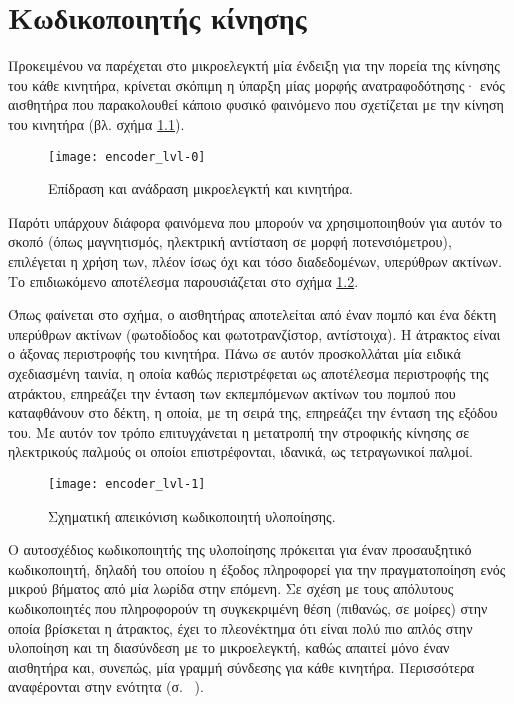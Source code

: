 \chapter{Κωδικοποιητής κίνησης}

Προκειμένου να παρέχεται στο μικροελεγκτή μία ένδειξη για την πορεία της κίνησης
του κάθε κινητήρα, κρίνεται σκόπιμη η ύπαρξη μίας μορφής ανατραφοδότησης· ενός
αισθητήρα που παρακολουθεί κάποιο φυσικό φαινόμενο που σχετίζεται με την κίνηση
του κινητήρα (βλ. σχήμα \ref{fig:encoder:lvl-0}).

\begin{figure}
    \caption{Επίδραση και ανάδραση μικροελεγκτή και κινητήρα.
    \label{fig:encoder:lvl-0}}
    \begin{center}
    \texttt{[image: encoder\_lvl-0]}
    \end{center}
\end{figure}

Παρότι υπάρχουν διάφορα φαινόμενα που μπορούν να χρησιμοποιηθούν για αυτόν το
σκοπό (όπως μαγνητισμός, ηλεκτρική αντίσταση σε μορφή ποτενσιόμετρου),
επιλέγεται η χρήση των, πλέον ίσως όχι και τόσο διαδεδομένων, υπερύθρων ακτίνων.
Το επιδιωκόμενο αποτέλεσμα παρουσιάζεται στο σχήμα \ref{fig:encoder:lvl-1}.

Όπως φαίνεται στο σχήμα, ο αισθητήρας αποτελείται από έναν πομπό και ένα δέκτη
υπερύθρων ακτίνων (φωτοδίοδος και φωτοτρανζίστορ, αντίστοιχα).
Η άτρακτος είναι ο άξονας περιστροφής του κινητήρα. Πάνω σε αυτόν προσκολλάται
μία ειδικά σχεδιασμένη ταινία, η οποία καθώς περιστρέφεται ως αποτέλεσμα
περιστροφής της ατράκτου, επηρεάζει την ένταση των εκπεμπόμενων ακτίνων του
πομπού που καταφθάνουν στο δέκτη, η οποία, με τη σειρά της, επηρεάζει την ένταση
της εξόδου του. Με αυτόν τον τρόπο επιτυγχάνεται η μετατροπή την στροφικής
κίνησης σε ηλεκτρικούς παλμούς οι οποίοι επιστρέφονται, ιδανικά, ως τετραγωνικοί
παλμοί.

\begin{figure}
    \caption{Σχηματική απεικόνιση κωδικοποιητή υλοποίησης.
    \label{fig:encoder:lvl-1}}
    \begin{center}
    \texttt{[image: encoder\_lvl-1]}
    \end{center}
\end{figure}

Ο αυτοσχέδιος κωδικοποιητής της υλοποίησης πρόκειται για έναν προσαυξητικό
κωδικοποιητή, δηλαδή του οποίου η έξοδος πληροφορεί για την πραγματοποίηση ενός
μικρού βήματος από μία λωρίδα στην επόμενη.
Σε σχέση με τους απόλυτους κωδικοποιητές που πληροφορούν τη συγκεκριμένη θέση
(πιθανώς, σε μοίρες) στην οποία βρίσκεται η άτρακτος, έχει το πλεονέκτημα ότι
είναι πολύ πιο απλός στην υλοποίηση και τη διασύνδεση με το μικροελεγκτή, καθώς
απαιτεί μόνο έναν αισθητήρα και, συνεπώς, μία γραμμή σύνδεσης για κάθε κινητήρα.
Περισσότερα αναφέρονται στην ενότητα  (σ.~%
\pageref{subsec:encoder:output}).

